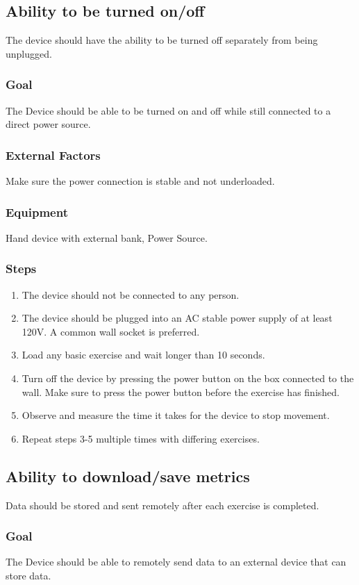 \documentclass{article}
\begin{document}
\subsection{Ability to be turned on/off}
The device should have the ability to be turned off separately from being unplugged.
\subsubsection{Goal} The Device should be able to be turned on and off while still connected to a direct power source.
\subsubsection{External Factors} Make sure the power connection is stable and not underloaded.
\subsubsection{Equipment} Hand device with external bank, Power Source.
\subsubsection{Steps}
\begin{enumerate}
\item The device should not be connected to any person.
\item The device should be plugged into an AC stable power supply of at least 120V. A
common wall socket is preferred.
\item Load any basic exercise and wait longer than 10 seconds.
\item Turn off the device by pressing the power button on the box connected to the wall. Make
sure to press the power button before the exercise has finished.
\item Observe and measure the time it takes for the device to stop movement.
\item Repeat steps 3-5 multiple times with differing exercises.
\end{enumerate}
\subsection{Ability to download/save metrics}
Data should be stored and sent remotely after each exercise is completed.
\subsubsection{Goal} The Device should be able to remotely send data to an external device that can store
data.
\end{document}
